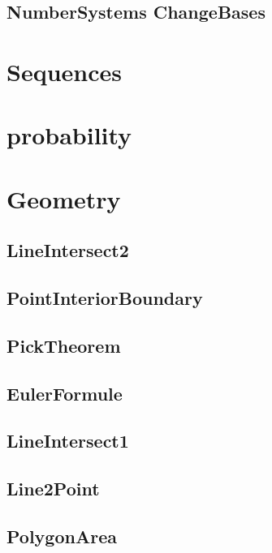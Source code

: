 \subsection{NumberSystems ChangeBases}
\raggedbottom
\hrulefill

\section{Sequences}

\section{probability}

\section{Geometry}
\subsection{ LineIntersect2}
\raggedbottom
\hrulefill
\subsection{ PointInteriorBoundary}
\raggedbottom
\hrulefill
\subsection{ PickTheorem}
\raggedbottom
\hrulefill
\subsection{ EulerFormule}
\raggedbottom
\hrulefill
\subsection{ LineIntersect1}
\raggedbottom
\hrulefill
\subsection{ Line2Point}
\raggedbottom
\hrulefill
\subsection{ PolygonArea}
\raggedbottom
\hrulefill

